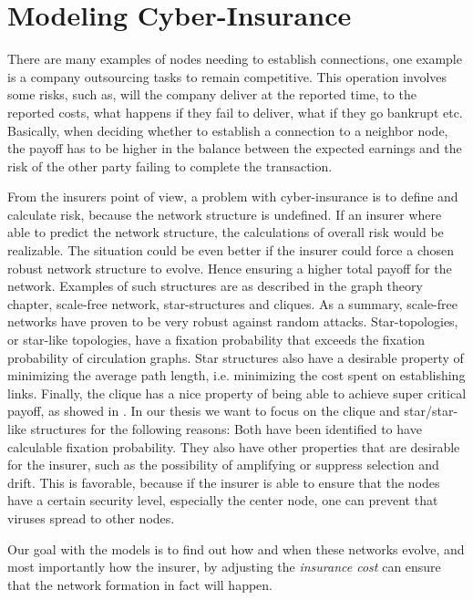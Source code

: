 \chapter{Modeling Cyber-Insurance }
\label{chp:modelingCyberInsurance} 

There are many examples of nodes needing to establish connections, one example is a company outsourcing tasks to remain competitive. This operation involves some risks, such as, will the company deliver at the reported time, to the reported costs, what happens if they fail to deliver, what if they go bankrupt etc. Basically, when deciding whether to establish a connection to a neighbor node, the payoff has to be higher in the balance between the expected earnings and the risk of the other party failing to complete the transaction.

From the insurers point of view, a problem with cyber-insurance is to define and calculate risk, because the network structure is undefined. If an insurer where able to predict the network structure, the calculations of overall risk would be realizable. The situation could be even better if the insurer could force a chosen robust network structure to evolve. Hence ensuring a higher total payoff for the network.
Examples of such structures are as described in the graph theory chapter, scale-free network, star-structures and cliques. As a summary, scale-free networks have proven to be very robust against random attacks. Star-topologies, or star-like topologies, have a fixation probability that exceeds the fixation probability of circulation graphs. Star structures also have a desirable property of minimizing the average path length, i.e. minimizing the cost spent on establishing links. Finally, the clique has a nice property of being able to achieve super critical payoff, as showed in \cite{contagion}.
In our thesis we want to focus on the clique and star/star-like structures for the following reasons: Both have been identified to have calculable fixation probability. They also have other properties that are desirable for the insurer, such as the possibility of amplifying or suppress selection and drift. This is favorable, because if the insurer is able to ensure that the nodes have a certain security level, especially the center node, one can prevent that viruses spread to other nodes.
 
Our goal with the models is to find out how and when these networks evolve, and most importantly how the insurer, by adjusting the \textit{insurance cost} can ensure that the network formation in fact will happen.

